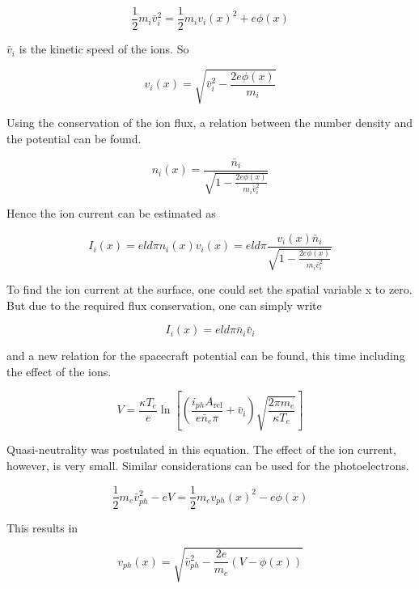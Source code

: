 \documentclass[a4paper,11pt]{thesis}
\begin{document}
\begin{equation}
    \frac{1}{2}m_i\bar{v}_i^2=\frac{1}{2}m_iv_i(x)^2+e\phi(x)
\end{equation}

$\bar{v}_i$ is the kinetic speed of the ions. So

\begin{equation}
    v_i(x)=\sqrt{\bar{v}_i^2-\frac{2e\phi(x)}{m_i}}
\end{equation}

Using the conservation of the ion flux, a relation between the number density and the potential can be found.

\begin{equation}
    n_i(x)=\frac{\bar{n}_i}{\sqrt{1-\frac{2e\phi(x)}{m_i\bar{v}_i^2}}}
\end{equation}


Hence the ion current can be estimated as

\begin{equation}
    I_i(x)=eld\pi n_i(x)v_i(x)=eld\pi \frac{v_i(x) \bar{n}_i}{\sqrt{1-\frac{2e\phi(x)}{m_i\bar{v}_i^2}}}
\end{equation}

To find the ion current at the surface, one could set the spatial variable x to zero. But due to the required flux conservation, one can simply write

\begin{equation}
    I_i(x)=eld\pi \bar{n}_i\bar{v}_i
\end{equation}

and a new relation for the spacecraft potential can be found, this time including the effect of the ions.

\begin{equation}
V=\frac{\kappa T_e}{e} \ln\left[\left(\frac{i_{ph} A_{\textrm{rel}}}{e\bar{n}_e  \pi}+\bar{v}_i\right) \sqrt{\frac{2\pi m_e}{\kappa T_e}}\right]
\end{equation}

Quasi-neutrality was postulated in this equation. The effect of the ion current, however, is very small. Similar considerations can be used for the photoelectrons.

\begin{equation}
    \frac{1}{2}m_e\bar{v}_{ph}^2-eV=\frac{1}{2}m_e v_{ph}(x)^2-e\phi(x)
\end{equation}

This results in

\begin{equation}
    v_{ph}(x)=\sqrt{\bar{v}_{ph}^2-\frac{2e}{m_e}\left(V-\phi(x)\right)}
\end{equation}
\end{document}
